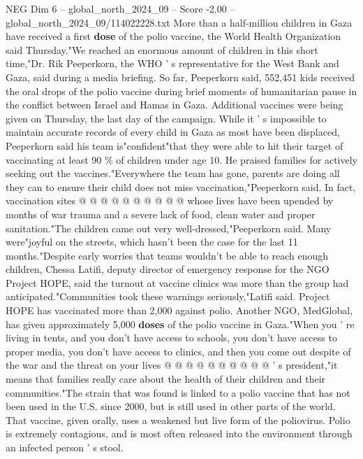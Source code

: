 \begin{textsample}{NEG Dim 6 – global\_north\_2024\_09 – Score -2.00 – global\_north\_2024\_09/114022228.txt}  \label{ex:f6_neg_019}
More than a half-million children in Gaza have received a first \textbf{dose} of the polio vaccine, the World Health Organization said Thursday."We reached an enormous amount of children in this short time,"Dr.
Rik Peeperkorn, the WHO ' s representative for the West Bank and Gaza, said during a media briefing.
So far, Peeperkorn said, 552,451 kids received the oral drops of the polio vaccine during brief moments of humanitarian pause in the conflict between Israel and Hamas in Gaza.
Additional vaccines were being given on Thursday, the last day of the campaign.
While it ' s impossible to maintain accurate records of every child in Gaza as most have been displaced, Peeperkorn said his team is"confident"that they were able to hit their target of vaccinating at least 90 \% of children under age 10.
He praised families for actively seeking out the vaccines."Everywhere the team has gone, parents are doing all they can to ensure their child does not miss vaccination,"Peeperkorn said.
In fact, vaccination sites @ @ @ @ @ @ @ @ @ @ whose lives have been upended by months of war trauma and a severe lack of food, clean water and proper sanitation."The children came out very well-dressed,"Peeperkorn said.
Many were"joyful on the streets, which hasn't been the case for the last 11 months."Despite early worries that teams wouldn't be able to reach enough children, Chessa Latifi, deputy director of emergency response for the NGO Project HOPE, said the turnout at vaccine clinics was more than the group had anticipated."Communities took these warnings seriously,"Latifi said.
Project HOPE has vaccinated more than 2,000 against polio.
Another NGO, MedGlobal, has given approximately 5,000 \textbf{doses} of the polio vaccine in Gaza."When you ' re living in tents, and you don't have access to schools, you don't have access to proper media, you don't have access to clinics, and then you come out despite of the war and the threat on your lives @ @ @ @ @ @ @ @ @ @ ' s president,"it means that families really care about the health of their children and their communities."The strain that was found is linked to a polio vaccine that has not been used in the U.S. since 2000, but is still used in other parts of the world.
That vaccine, given orally, uses a weakened but live form of the poliovirus.
Polio is extremely contagious, and is most often released into the environment through an infected person ' s stool.

\end{textsample}
